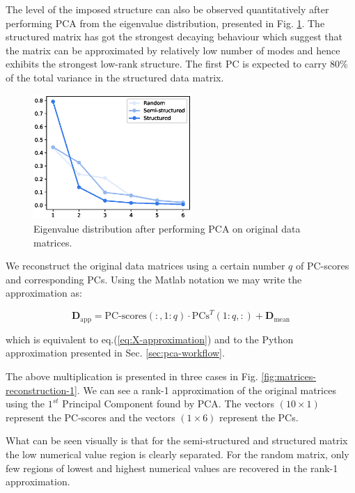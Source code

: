\documentclass[10pt,twocolumn]{article}
\begin{document}
The level of the imposed structure can also be observed quantitatively after performing PCA from the eigenvalue distribution, presented in Fig. \ref{fig:eigenvalues}. The structured matrix has got the strongest decaying behaviour which suggest that the matrix can be approximated by relatively low number of modes and hence exhibits the strongest low-rank structure. The first PC is expected to carry 80\% of the total variance in the structured data matrix.

\begin{figure}[H]
\centering\includegraphics[width=6cm]{DWGs/matrix-reconstruction-eigenvalues-comparison.eps}
\caption{Eigenvalue distribution after performing PCA on original data matrices.}			
\label{fig:eigenvalues}
\end{figure}

We reconstruct the original data matrices using a certain number $q$ of PC-scores and corresponding PCs. Using the Matlab notation we may write the approximation as:

\begin{equation} \label{eq:data-set-approximation}
\bm{D}_{\text{app}} = \text{PC-scores}(:,1:q) \cdot \text{PCs}^T(1:q,:) + \bm{D}_{\text{mean}}
\end{equation}

which is equivalent to eq.(\ref{eq:X-approximation}) and to the Python approximation presented in Sec. \ref{sec:pca-workflow}.

The above multiplication is presented in three cases in Fig. \ref{fig:matrices-reconstruction-1}. We can see a rank-1 approximation of the original matrices using the $1^{st}$ Principal Component found by PCA. The vectors $(10 \times 1)$ represent the PC-scores and the vectors $(1 \times 6)$ represent the PCs.

What can be seen visually is that for the semi-structured and structured matrix the low numerical value region is clearly separated. For the random matrix, only few regions of lowest and highest numerical values are recovered in the rank-1 approximation.
\end{document}
